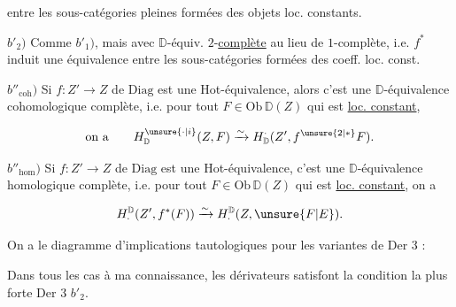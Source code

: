 

entre les sous-catégories pleines formées des objets loc. constants.

$b'_2)$ Comme $b'_1)$, mais avec $\mathbb D$-équiv. $2$-\uline{complète} au lieu de $1$-complète, i.e. $f^*$ induit une équivalence entre les sous-catégories formées des coeff. loc. const.

$b''_{\mathrm{coh}})$ Si $f:Z'\to Z$ de $\mathrm{Diag}$ est une Hot-équivalence, alors c'est une $\mathbb D$-équivalence cohomologique complète, i.e. pour tout $F\in\mathrm{Ob}\,\mathbb D(Z)$ qui est \uline{loc. constant},

\[
\text{on a}\qquad H^{\unsure{\cdot|i}}_{\mathbb D}(Z,F)\xrightarrow{\sim}H^{\cdot}_{\mathbb D}(Z',f^{\unsure{2|*}}F).
\]

$b''_{\mathrm{hom}})$ Si $f:Z'\to Z$ de $\mathrm{Diag}$ est une Hot-équivalence, c'est une $\mathbb D$-équivalence homologique complète, i.e. pour tout $F\in\mathrm{Ob}\,\mathbb D(Z)$ qui est \uline{loc. constant}, on a

\[
H_{\cdot}^{\mathbb D}(Z',f^*(F))\xrightarrow{\sim}H_{\cdot}^{\mathbb D}(Z,\unsure{F|E}).
\]


On a le diagramme d'implications tautologiques pour les variantes de Der 3 :


Dans tous les cas à ma connaissance, les dérivateurs satisfont la condition la plus forte Der 3 $b'_2$.

